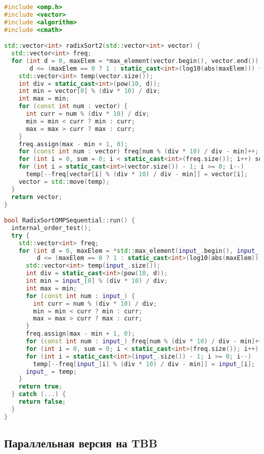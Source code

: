 \documentclass[]{article}
\theoremstyle{remark}
\theoremstyle{definition}
\begin{document}
\begin{lstlisting}[language=C++]
#include <omp.h>
#include <vector>
#include <algorithm>
#include <cmath>

std::vector<int> radixSort2(std::vector<int> vector) {
  std::vector<int> freq;
  for (int d = 0, maxElem = *max_element(vector.begin(), vector.end());
       d <= (maxElem == 0 ? 1 : static_cast<int>(log10(abs(maxElem))) + 1); d++) {
    std::vector<int> temp(vector.size());
    int div = static_cast<int>(pow(10, d));
    int min = vector[0] % (div * 10) / div;
    int max = min;
    for (const int num : vector) {
      int curr = num % (div * 10) / div;
      min = min < curr ? min : curr;
      max = max > curr ? max : curr;
    }
    freq.assign(max - min + 1, 0);
    for (const int num : vector) freq[num % (div * 10) / div - min]++;
    for (int i = 0, sum = 0; i < static_cast<int>(freq.size()); i++) sum += freq[i], freq[i] = sum;
    for (int i = static_cast<int>(vector.size()) - 1; i >= 0; i--)
      temp[--freq[vector[i] % (div * 10) / div - min]] = vector[i];
    vector = std::move(temp);
  }
  return vector;
}

bool RadixSortOMPSequential::run() {
  internal_order_test();
  try {
    std::vector<int> freq;
    for (int d = 0, maxElem = *std::max_element(input_.begin(), input_.end());
         d <= (maxElem == 0 ? 1 : static_cast<int>(log10(abs(maxElem))) + 1); d++) {
      std::vector<int> temp(input_.size());
      int div = static_cast<int>(pow(10, d));
      int min = input_[0] % (div * 10) / div;
      int max = min;
      for (const int num : input_) {
        int curr = num % (div * 10) / div;
        min = min < curr ? min : curr;
        max = max > curr ? max : curr;
      }
      freq.assign(max - min + 1, 0);
      for (const int num : input_) freq[num % (div * 10) / div - min]++;
      for (int i = 0, sum = 0; i < static_cast<int>(freq.size()); i++) sum += freq[i], freq[i] = sum;
      for (int i = static_cast<int>(input_.size()) - 1; i >= 0; i--)
        temp[--freq[input_[i] % (div * 10) / div - min]] = input_[i];
      input_ = temp;
    }
    return true;
  } catch (...) {
    return false;
  }
}
\end{lstlisting}

\subsection{Параллельная версия на TBB}
\end{document}
